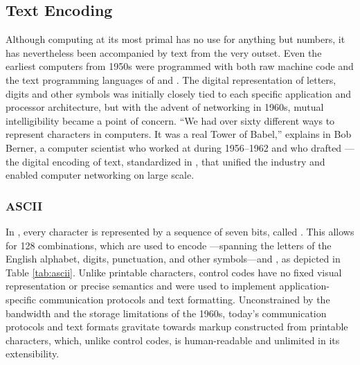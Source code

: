 \documentclass{book}
\begin{document}
\subsection{Text Encoding}
Although computing at its most primal has no use for anything but numbers, it
has nevertheless been accompanied by text from the very outset. Even the
earliest computers from 1950s were programmed with both raw machine code and
the text programming languages of  and . The
digital representation of letters, digits and other symbols was initially
closely tied to each specific application and processor architecture, but with
the advent of networking in 1960s, mutual intelligibility became a point of
concern. ``We had over sixty different ways to represent characters in
computers. It was a real Tower of Babel,'' explains in \cite{brandel99} Bob
Berner, a computer scientist who worked at  during 1956--1962 and
who drafted ---the digital encoding of text, standardized in
\cite{asa63}, that unified the industry and enabled computer networking on large
scale.

\subsubsection{ASCII}
In , every character is represented by a sequence of seven bits,
called . This allows for 128 combinations, which
are used to encode ---spanning the letters of
the English alphabet, digits, punctuation, and other symbols---and
, as depicted in Table \ref{tab:ascii}. Unlike
printable characters, control codes have no fixed visual representation or
precise semantics and were used to implement application-specific communication
protocols and text formatting. Unconstrained by the bandwidth and the storage
limitations of the 1960s, today's communication protocols and text formats
gravitate towards markup constructed from printable characters, which, unlike
control codes, is human-readable and unlimited in its extensibility.


\end{document}

